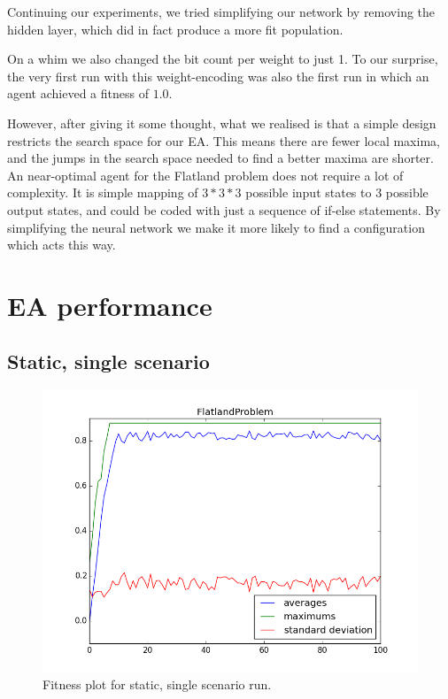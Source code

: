 \documentclass[twoside]{article}
\begin{document}
\begin{multicols}{2}
  Continuing our experiments,
  we tried simplifying our network by removing the hidden layer,
  which did in fact produce a more fit population.

  On a whim we also changed the bit count per weight to just 1.
  To our surprise,
  the very first run with this weight-encoding was also the first run in which an agent achieved a fitness of $1.0$.

  However, after giving it some thought,
  what we realised is that a simple design restricts the search space for our EA.
  This means there are fewer local maxima, 
  and the jumps in the search space needed to find a better maxima are shorter.
  An near-optimal agent for the Flatland problem does not require a lot of complexity.
  It is simple mapping of $3*3*3$ possible input states to 3 possible output states,
  and could be coded with just a sequence of if-else statements.
  By simplifying the neural network we make it more likely to find a configuration which acts this way.

  \section{EA performance}

  \subsection{Static, single scenario}

  \begin{figure}[H]
    \centering
    \includegraphics[width=\linewidth]{images/static_1.png}
    \caption{Fitness plot for static, single scenario run.} \label{fig:static-single}
  \end{figure}


\end{multicols}
\end{document}
